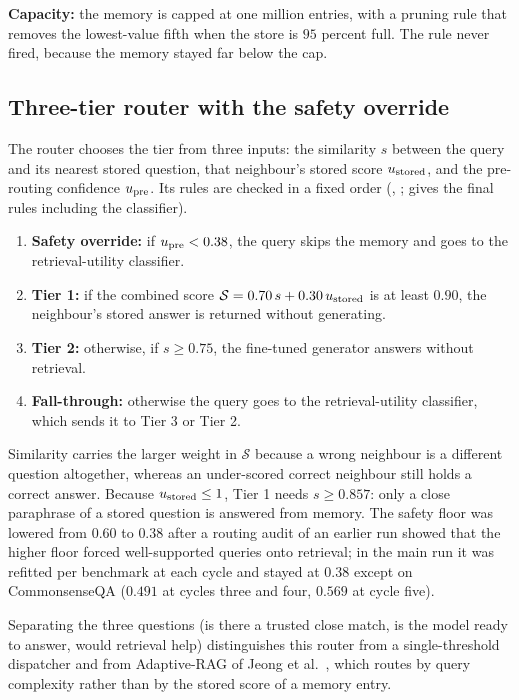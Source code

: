 \textbf{Capacity:} the memory is capped at one million entries, with a pruning rule that removes the lowest-value fifth when the store is $95$ percent full. The rule never fired, because the memory stayed far below the cap.

\subsection{Three-tier router with the safety override}
\label{sec:router}

The router chooses the tier from three inputs: the similarity $s$ between the query and its nearest stored question, that neighbour's stored score $u_{\text{stored}}$, and the pre-routing confidence $u_{\text{pre}}$. Its rules are checked in a fixed order (, ;  gives the final rules including the classifier).
\begin{enumerate}
    \item \textbf{Safety override:} if $u_{\text{pre}} < 0.38$, the query skips the memory and goes to the retrieval-utility classifier.
    \item \textbf{Tier 1:} if the combined score $\mathcal{S} = 0.70\,s + 0.30\,u_{\text{stored}}$ is at least $0.90$, the neighbour's stored answer is returned without generating.
    \item \textbf{Tier 2:} otherwise, if $s \ge 0.75$, the fine-tuned generator answers without retrieval.
    \item \textbf{Fall-through:} otherwise the query goes to the retrieval-utility classifier, which sends it to Tier 3 or Tier 2.
\end{enumerate}
Similarity carries the larger weight in $\mathcal{S}$ because a wrong neighbour is a different question altogether, whereas an under-scored correct neighbour still holds a correct answer. Because $u_{\text{stored}} \le 1$, Tier 1 needs $s \ge 0.857$: only a close paraphrase of a stored question is answered from memory. The safety floor was lowered from $0.60$ to $0.38$ after a routing audit of an earlier run showed that the higher floor forced well-supported queries onto retrieval; in the main run it was refitted per benchmark at each cycle and stayed at $0.38$ except on CommonsenseQA ($0.491$ at cycles three and four, $0.569$ at cycle five).

Separating the three questions (is there a trusted close match, is the model ready to answer, would retrieval help) distinguishes this router from a single-threshold dispatcher and from Adaptive-RAG of Jeong et al.~\cite{jeong2024adaptive}, which routes by query complexity rather than by the stored score of a memory entry.

